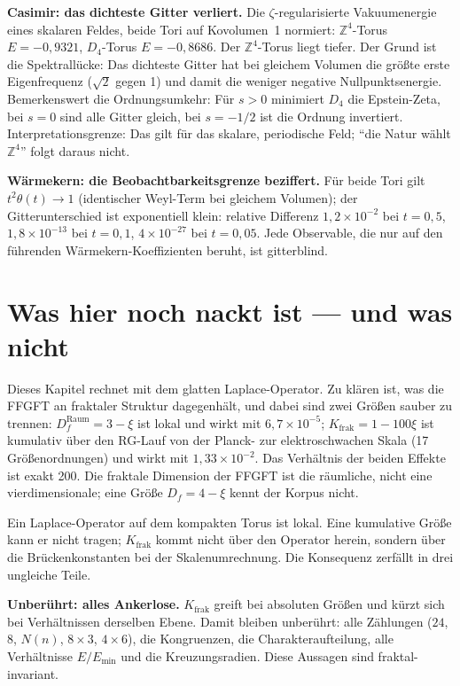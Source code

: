 \textbf{Casimir: das dichteste Gitter verliert.} Die
$\zeta$-regularisierte Vakuumenergie eines skalaren Feldes, beide Tori
auf Kovolumen~1 normiert: $\mathbb{Z}^4$-Torus $E = -0{,}9321$,
$D_4$-Torus $E = -0{,}8686$. Der $\mathbb{Z}^4$-Torus liegt tiefer. Der
Grund ist die Spektrallücke: Das dichteste Gitter hat bei gleichem
Volumen die größte erste Eigenfrequenz ($\sqrt2$ gegen 1) und damit die
weniger negative Nullpunktsenergie. Bemerkenswert die Ordnungsumkehr:
Für $s>0$ minimiert $D_4$ die Epstein-Zeta, bei $s = 0$ sind alle Gitter
gleich, bei $s = -1/2$ ist die Ordnung invertiert. Interpretationsgrenze:
Das gilt für das skalare, periodische Feld; \enquote{die Natur wählt
$\mathbb{Z}^4$} folgt daraus nicht.

\textbf{Wärmekern: die Beobachtbarkeitsgrenze beziffert.} Für beide Tori
gilt $t^2\theta(t)\to1$ (identischer Weyl-Term bei gleichem Volumen); der
Gitterunterschied ist exponentiell klein: relative Differenz
$1{,}2\times10^{-2}$ bei $t = 0{,}5$, $1{,}8\times10^{-13}$ bei
$t = 0{,}1$, $4\times10^{-27}$ bei $t = 0{,}05$. Jede Observable, die nur
auf den führenden Wärmekern-Koeffizienten beruht, ist gitterblind.

\section{Was hier noch nackt ist --- und was nicht}

Dieses Kapitel rechnet mit dem glatten Laplace-Operator. Zu klären ist,
was die FFGFT an fraktaler Struktur dagegenhält, und dabei sind zwei
Größen sauber zu trennen: $D_f^{\mathrm{Raum}} = 3-\xi$ ist lokal und
wirkt mit $6{,}7\times10^{-5}$; $K_{\mathrm{frak}} = 1-100\xi$ ist
kumulativ über den RG-Lauf von der Planck- zur elektroschwachen Skala
(17 Größenordnungen) und wirkt mit $1{,}33\times10^{-2}$. Das
Verhältnis der beiden Effekte ist exakt 200. Die fraktale Dimension der
FFGFT ist die räumliche, nicht eine vierdimensionale; eine Größe
$D_f = 4-\xi$ kennt der Korpus nicht.

Ein Laplace-Operator auf dem kompakten Torus ist lokal. Eine kumulative
Größe kann er nicht tragen; $K_{\mathrm{frak}}$ kommt nicht über den
Operator herein, sondern über die Brückenkonstanten bei der
Skalenumrechnung. Die Konsequenz zerfällt in drei ungleiche Teile.

\textbf{Unberührt: alles Ankerlose.} $K_{\mathrm{frak}}$ greift bei
absoluten Größen und kürzt sich bei Verhältnissen derselben Ebene. Damit
bleiben unberührt: alle Zählungen ($24$, $8$, $N(n)$, $8\times3$,
$4\times6$), die Kongruenzen, die Charakteraufteilung, alle Verhältnisse
$E/E_{\min}$ und die Kreuzungsradien. Diese Aussagen sind
fraktal-invariant.

